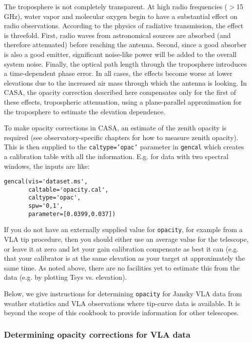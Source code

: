 The troposphere is not completely transparent.  At high radio
frequencies ($>$15 GHz), water vapor and molecular oxygen begin to
have a substantial effect on radio observations. According to the
physics of radiative transmission, the effect is threefold.  First,
radio waves from astronomical sources are absorbed (and therefore
attenuated) before reaching the antenna.  Second, since a good absorber
is also a good emitter, significant noise-like power will be added to
the overall system noise.  Finally, the optical path length through
the troposphere introduces a time-dependent phase error.  In all
cases, the effects become worse at lower elevations due to the
increased air mass through which the antenna is looking.  In CASA,
the opacity correction described here compensates only for the first
of these effects, tropospheric attenuation, using a plane-parallel
approximation for the troposphere to estimate the elevation
dependence.

To make
opacity corrections in CASA, an estimate of the zenith opacity is
required (see observatory-specific chapters for how to measure zenith
opacity).  This is then supplied to the {\tt caltype='opac'} parameter
in {\tt gencal} which creates a calibration table with all the
information. E.g. for data with two spectral windows, the inputs are
like: 
\small
\begin{verbatim}
gencal(vis='dataset.ms',
       caltable='opacity.cal',
       caltype='opac',
       spw='0,1',
       parameter=[0.0399,0.037])
\end{verbatim}
\normalsize


If you do not have an externally supplied value for {\tt opacity}, for
example from a VLA tip procedure, then you should either use an
average value for the telescope, or leave it at zero and let
your gain calibration compensate as best it can (e.g. that your 
calibrator is at the same elevation as your target at approximately 
the same time. As noted above, there are no facilities yet to estimate this from the
data (e.g. by plotting Tsys vs. elevation).

Below, we give instructions for determining {\tt opacity} for Jansky VLA
data from weather statistics and VLA observations where tip-curve data
is available.  It is beyond the scope of this cookbook to provide
information for other telescopes.

\subsubsection{Determining opacity corrections for VLA data}
\label{section:cal.prior.opacity.evla}

